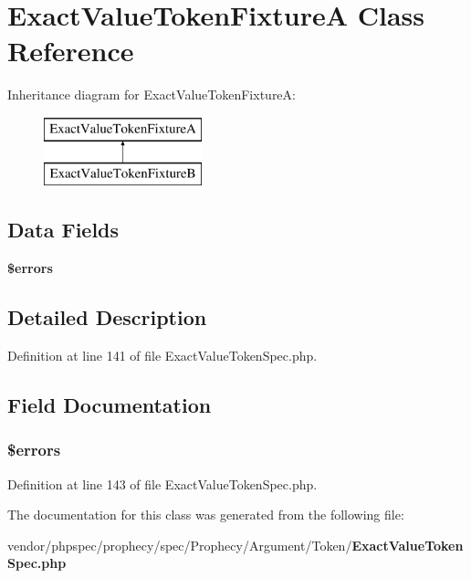 \section{Exact\+Value\+Token\+Fixture\+A Class Reference}
\label{classspec_1_1_prophecy_1_1_argument_1_1_token_1_1_exact_value_token_fixture_a}
Inheritance diagram for Exact\+Value\+Token\+Fixture\+A\+:\begin{figure}[H]
\begin{center}
\leavevmode
\includegraphics[height=2.000000cm]{classspec_1_1_prophecy_1_1_argument_1_1_token_1_1_exact_value_token_fixture_a}
\end{center}
\end{figure}
\subsection*{Data Fields}
\begin{DoxyCompactItemize}
\item 
{\bf \$errors}
\end{DoxyCompactItemize}


\subsection{Detailed Description}


Definition at line 141 of file Exact\+Value\+Token\+Spec.\+php.



\subsection{Field Documentation}
\subsubsection[{\$errors}]{\setlength{\rightskip}{0pt plus 5cm}\$errors}\label{classspec_1_1_prophecy_1_1_argument_1_1_token_1_1_exact_value_token_fixture_a_ab24faf4aa647cdcee494fc48524ad4ff}


Definition at line 143 of file Exact\+Value\+Token\+Spec.\+php.



The documentation for this class was generated from the following file\+:\begin{DoxyCompactItemize}
\item 
vendor/phpspec/prophecy/spec/\+Prophecy/\+Argument/\+Token/{\bf Exact\+Value\+Token\+Spec.\+php}\end{DoxyCompactItemize}
